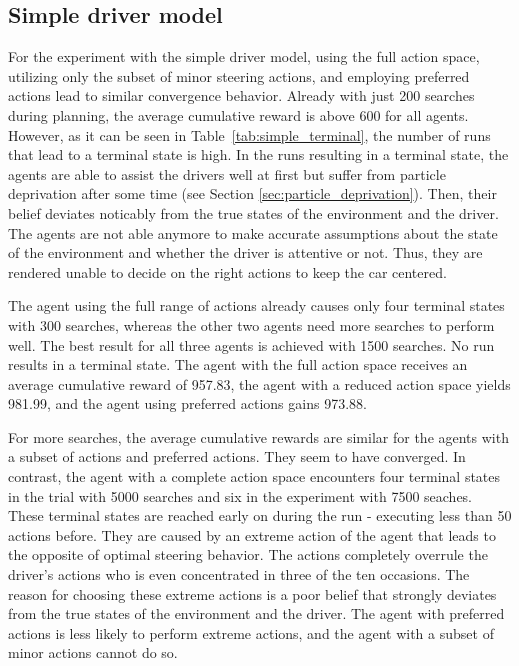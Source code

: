 \subsection{Simple driver model}

For the experiment with the simple driver model, using the full action space, utilizing only the subset of minor steering actions, and employing preferred actions lead to similar convergence behavior. Already with just 200 searches during planning, the average cumulative reward is above 600 for all agents. However, as it can be seen in Table~\ref{tab:simple_terminal}, the number of runs that lead to a terminal state is high. In the runs resulting in a terminal state, the agents are able to assist the drivers well at first but suffer from particle deprivation after some time (see Section \ref{sec:particle_deprivation}). Then, their belief deviates noticably from the true states of the environment and the driver. The agents are not able anymore to make accurate assumptions about the state of the environment and whether the driver is attentive or not. Thus, they are rendered unable to decide on the right actions to keep the car centered. 



The agent using the full range of actions already causes only four terminal states with 300 searches, whereas the other two agents need more searches to perform well. The best result for all three agents is achieved with 1500 searches. No run results in a terminal state. The agent with the full action space receives an average cumulative reward of 957.83, the agent with a reduced action space yields 981.99, and the agent using preferred actions gains 973.88. 

For more searches, the average cumulative rewards are similar for the agents with a subset of actions and preferred actions. They seem to have converged. In contrast, the agent with a complete action space encounters four terminal states in the trial with 5000 searches and six in the experiment with 7500 seaches. These terminal states are reached early on during the run - executing less than 50 actions before. They are caused by an extreme action of the agent that leads to the opposite of optimal steering behavior. The actions completely overrule the driver's actions who is even concentrated in three of the ten occasions. The reason for choosing these extreme actions is a poor belief that strongly deviates from the true states of the environment and the driver. The agent with preferred actions is less likely to perform extreme actions, and the agent with a subset of minor actions cannot do so. 

